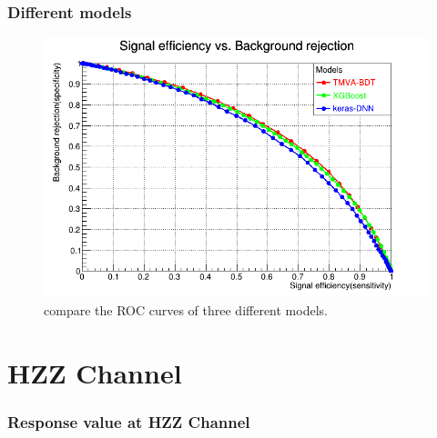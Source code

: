 \documentclass{beamer}
\begin{document}
\begin{frame}
\frametitle{Different models}
\begin{figure}
\includegraphics[scale=0.25]{./figures/ROC_Curve_models_points.png}
\caption{compare the ROC curves of three different models.}
\end{figure}
\end{frame}

\section{HZZ Channel }
\begin{frame}
\frametitle{Response value at HZZ Channel}
\begin{figure}[H]
\centering
{} 
\end{figure}
\end{frame}
\end{document}
